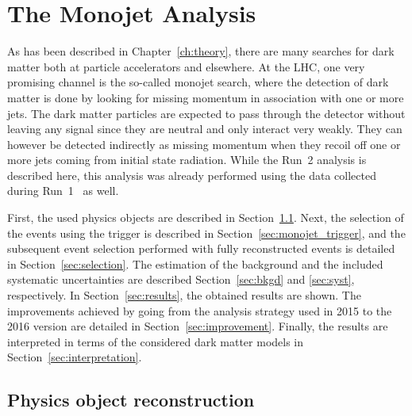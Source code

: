 \graphicspath{{chapt_dutch/}{intro/}{monojet/}}

\renewcommand\evenpagerightmark{{\scshape\small Chapter 5}}
\renewcommand\oddpageleftmark{{\scshape\small The Monojet Analysis}}

\hyphenation{}

\chapter{The Monojet Analysis}
\label{ch:monojet}

As has been described in Chapter~\ref{ch:theory}, there are many searches for dark matter both at particle accelerators and elsewhere. At the \ac{LHC}, one very promising channel is the so-called monojet search, where the detection of dark matter is done by looking for missing momentum in association with one or more jets. The dark matter particles are expected to pass through the detector without leaving any signal since they are neutral and only interact very weakly. They can however be detected indirectly as missing momentum when they recoil off one or more jets coming from initial state radiation. While the Run~2 analysis is described here, this analysis was already performed using the data collected during Run~1~\cite{Khachatryan:2014rra} as well.

First, the used physics objects are described in Section~\ref{sec:monojet_objects}. Next, the selection of the events using the trigger is described in Section~\ref{sec:monojet_trigger}, and the subsequent event selection performed with fully reconstructed events is detailed in Section~\ref{sec:selection}. The estimation of the background and the included systematic uncertainties are described Section~\ref{sec:bkgd} and \ref{sec:syst}, respectively. In Section~\ref{sec:results}, the obtained results are shown. The improvements achieved by going from the analysis strategy used in 2015 to the 2016 version are detailed in Section~\ref{sec:improvement}. Finally, the results are interpreted in terms of the considered dark matter models in Section~\ref{sec:interpretation}.


\section{Physics object reconstruction}
\label{sec:monojet_objects}

